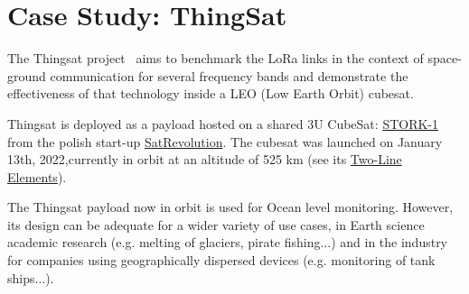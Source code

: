 \section{Case Study: ThingSat}
\label{sec:case-study}


The Thingsat project~\cite{git:thingsat-repo} aims to benchmark the LoRa links in the context of
space-ground communication for several frequency bands and demonstrate the
effectiveness of that technology inside a LEO (Low Earth Orbit) cubesat.

Thingsat is deployed as a payload hosted on a shared 3U CubeSat: \href{https://space.skyrocket.de/doc_sdat/stork-1.htm}{STORK-1} from the polish start-up \href{https://www.satrevolution.com/}{SatRevolution}. The cubesat was launched on January 13th, 2022,currently in orbit at an altitude of 525 km (see its 
\href{https://www.n2yo.com/database/?q=STORK-1\#results}{Two-Line Elements}).

The Thingsat payload now in orbit is used for Ocean level monitoring.
However, its design can be adequate for a wider variety of use cases, in Earth science academic research (e.g. melting of glaciers, pirate fishing...) and in the industry for companies using geographically dispersed devices (e.g. monitoring of tank ships...). 

